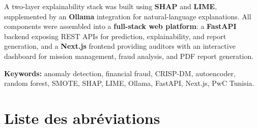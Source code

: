 \documentclass[12pt,a4paper,twoside]{report}
\begin{document}
A two-layer explainability stack was built using \textbf{SHAP} and \textbf{LIME}, supplemented by an \textbf{Ollama} integration for natural-language explanations. All components were assembled into a \textbf{full-stack web platform}: a \textbf{FastAPI} backend exposing REST APIs for prediction, explainability, and report generation, and a \textbf{Next.js} frontend providing auditors with an interactive dashboard for mission management, fraud analysis, and PDF report generation.

\vspace{0.5cm}
\textbf{Keywords:} anomaly detection, financial fraud, CRISP-DM, autoencoder, random forest, SMOTE, SHAP, LIME, Ollama, FastAPI, Next.js, PwC Tunisia.

\newpage

\tableofcontents
\newpage

\chapter*{Liste des abréviations}
\end{document}
